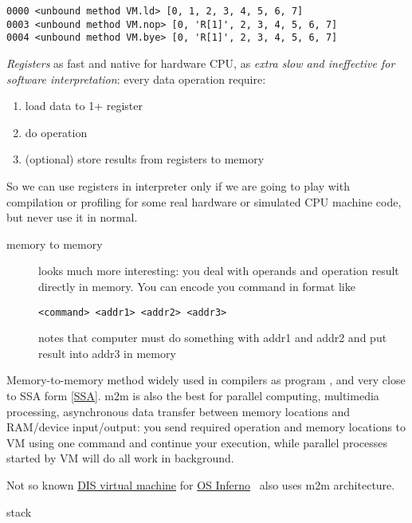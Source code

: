 
\begin{lstlisting}
0000 <unbound method VM.ld> [0, 1, 2, 3, 4, 5, 6, 7]
0003 <unbound method VM.nop> [0, 'R[1]', 2, 3, 4, 5, 6, 7]
0004 <unbound method VM.bye> [0, 'R[1]', 2, 3, 4, 5, 6, 7]
\end{lstlisting}

\bigskip
\emph{Registers} as fast and native for hardware CPU, as \emph{extra slow and
ineffective for software interpretation}: every data operation require:
\begin{enumerate}[nosep]
\item load data to 1+ register
\item do operation
\item (optional) store results from registers to memory 
\end{enumerate}

\bigskip
So we can use registers in interpreter only if we are going to play with
compilation or profiling for some real hardware or simulated CPU machine code,
but never use it in normal.

\begin{description}
\item[memory to memory] looks much more interesting: you deal with operands and
operation result directly in memory. You can encode you command in format like
\begin{lstlisting}
<command> <addr1> <addr2> <addr3> 
\end{lstlisting}
notes that computer must do something with addr1 and addr2 and put result into
addr3 in memory
\end{description}

Memory-to-memory method widely used in compilers as program  \cite{dragon}, and very close to SSA form \ref{SSA}. m2m is also
the best for parallel computing, multimedia processing, asynchronous data transfer between memory locations and
RAM/device input/output: you send required operation and memory locations to VM using one
command and continue your execution, while parallel processes started by VM will
do all work in background.

Not so known \href{http://www.vitanuova.com/inferno/papers/dis.html}{DIS virtual
machine} for \href{http://www.vitanuova.com/inferno/}{OS Inferno}\  also uses m2m architecture. 

\begin{description}
\item[stack]
\end{description}
